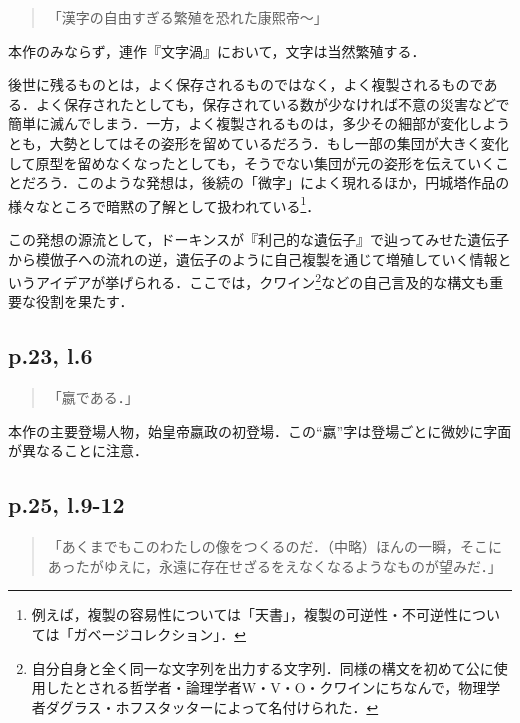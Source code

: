 \documentclass[10pt, a5paper, twoside]{jsarticle}
\theoremstyle{definition}
\begin{document}
		\begin{quote}

			「漢字の自由すぎる繁殖を恐れた康熙帝〜」

		\end{quote}

		本作のみならず，連作『文字渦』において，文字は当然繁殖する．

		後世に残るものとは，よく保存されるものではなく，よく複製されるものである．よく保存されたとしても，保存されている数が少なければ不意の災害などで簡単に滅んでしまう．一方，よく複製されるものは，多少その細部が変化しようとも，大勢としてはその姿形を留めているだろう．もし一部の集団が大きく変化して原型を留めなくなったとしても，そうでない集団が元の姿形を伝えていくことだろう．このような発想は，後続の「微字」によく現れるほか，円城塔作品の様々なところで暗黙の了解として扱われている\footnote{例えば，複製の容易性については「天書」，複製の可逆性・不可逆性については「ガベージコレクション」．}．

		この発想の源流として，ドーキンスが『利己的な遺伝子』で辿ってみせた遺伝子から模倣子への流れの逆，遺伝子のように自己複製を通じて増殖していく情報というアイデアが挙げられる．ここでは，クワイン\footnote{自分自身と全く同一な文字列を出力する文字列．同様の構文を初めて公に使用したとされる哲学者・論理学者W・V・O・クワインにちなんで，物理学者ダグラス・ホフスタッターによって名付けられた\cite{geb}．}などの自己言及的な構文も重要な役割を果たす．

		\subsection{p.23, l.6}

		\begin{quote}

			「嬴である．」

		\end{quote}

		本作の主要登場人物，始皇帝嬴政の初登場．この“嬴”字は登場ごとに微妙に字面が異なることに注意．

		\subsection{p.25, l.9-12}

		\begin{quote}

			「あくまでもこのわたしの像をつくるのだ．（中略）ほんの一瞬，そこにあったがゆえに，永遠に存在せざるをえなくなるようなものが望みだ．」

		\end{quote}
\end{document}
